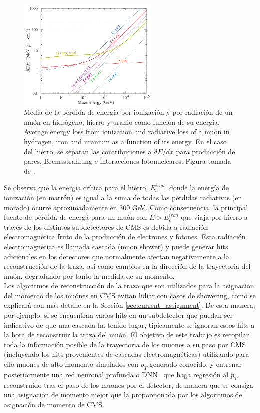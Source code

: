 \begin{figure}
\centering
\includegraphics[width=0.60\textwidth]{figures/dEdx.png}
\caption{Media de la p\'erdida de energ\'ia por ionizaci\'on y por radiaci\'on de un mu\'on en hidr\'ogeno, hierro y uranio como funci\'on de su energ\'ia.  Average energy loss from ionization and radiative loss of a muon in hydrogen, iron and uranium as a function of its energy. En el caso del hierro, se separan las contribuciones a $dE/dx$ para producci\'on de pares, Bremsstrahlung e interacciones fotonucleares. Figura tomada de \cite{Tanabashi:2018oca}.}
\label{fig:dEdX}        
\end{figure}

Se observa que la energ\'ia cr\'itica para el hierro, $E^{iron}_{c}$, donde la energ\'ia de ionizaci\'on (en marr\'on) es igual a la suma de todas las p\'erdidas radiativas (en morado) ocurre aproximadamente en 300 GeV. Como consecuencia, la principal fuente de p\'erdida de energ\'a para un mu\'on con $E>E^{iron}_{c}$ que viaja por hierro a trav\'es de los distintos subdetectores de CMS es debida a radiaci\'on electromagn\'etica fruto de la producci\'on de electrones y fotones. Esta radiaci\'on electromagn\'etica es llamada cascada (muon shower) y puede generar hits adicionales en los detectores que normalmente afectan negativamente a la reconstrucci\'on de la traza, as\'i como cambios en la direcci\'on de la trayectoria del mu\'on, degradando por tanto la medida de su momento. \\

Los algoritmos de reconstrucci\'on de la traza que son utilizados para la asignaci\'on del momento de los mu\'ones en CMS evitan lidiar con casos de showering, como se explicar\'a con m\'as detalle en la Secci\'on \ref{sec:current_assignment}. De esta manera, por ejemplo, si se encuentran varios hits en un subdetector que puedan ser indicativo de que una cascada ha tenido lugar, t\'ipicamente se ignoran estos hits a la hora de reconstruir la traza del mu\'on. El objetivo de este trabajo es recopilar toda la informaci\'on posible de la trayectoria de los muones a su paso por CMS (incluyendo los hits provenientes de cascadas electromagn\'eticas) utilizando para ello muones de alto momento simulados con $p_{T}$ generado conocido, y entrenar posteriormente una red neuronal profunda o DNN~\cite{Schmidhuber:2015} que haga regresi\'on al $p_{T}$ reconstruido tras el paso de los muones por el detector, de manera que se consiga una asignaci\'on de momento mejor que la proporcionada por los algoritmos de asignaci\'on de momento de CMS.

